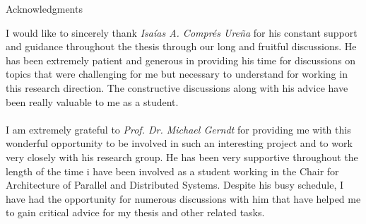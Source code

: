 \thispagestyle{empty}

\vspace*{2cm}

\begin{center}
{ Acknowledgments}
\end{center}

\vspace{1cm}
\noindent
I would like to sincerely thank \textit{Isa\'{i}as A. Compr\'{e}s Ure\~{n}a} for his constant support and guidance throughout the thesis through our long and fruitful discussions. He has been extremely patient and generous in providing his time for discussions on topics that were challenging for me but necessary to understand for working in this research direction. The constructive discussions along with his advice have been really valuable to me as a student.\\ \\
I am extremely grateful to \textit{Prof. Dr. Michael Gerndt} for providing me with this wonderful opportunity to be involved in such an interesting project and to work very closely with his research group. He has been very supportive throughout the length of the time i have been involved as a student working in the Chair for Architecture of Parallel and Distributed Systems. Despite his busy schedule, I have had the opportunity for numerous discussions with him that have helped me to gain critical advice for my thesis and other related tasks.
\cleardoublepage{}
